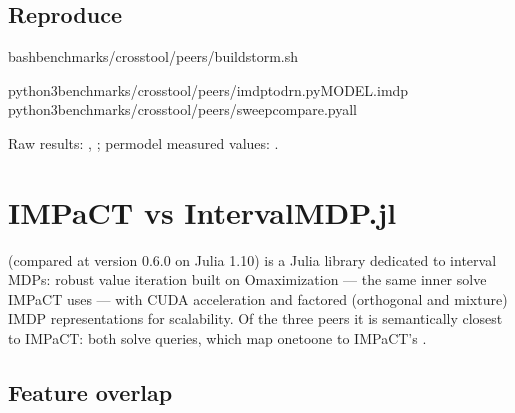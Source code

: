 \documentclass[a4paper,10pt,english]{sphinxmanual}
\begin{document}
\subsection{Reproduce}
\label{\detokenize{comparison/impact-vs-storm:reproduce}}
\begin{sphinxVerbatim}[commandchars=\\\{\}]
bashbenchmarks/crosstool/peers/build\PYGZus{}storm.sh

python3benchmarks/crosstool/peers/imdp\PYGZus{}to\PYGZus{}drn.pyMODEL.imdp
python3benchmarks/crosstool/peers/sweep\PYGZus{}compare.pyall
\end{sphinxVerbatim}

\sphinxAtStartPar
Raw results: , ; per\sphinxhyphen{}model measured
values: .

\sphinxstepscope


\section{IMPaCT vs IntervalMDP.jl}
\label{\detokenize{comparison/impact-vs-intervalmdp:impact-vs-intervalmdp-jl}}\label{\detokenize{comparison/impact-vs-intervalmdp::doc}}
\sphinxAtStartPar
{} (compared at version 0.6.0 on
Julia 1.10) is a Julia library dedicated to interval MDPs: robust value iteration built
on O\sphinxhyphen{}maximization — the same inner solve IMPaCT uses — with CUDA acceleration and
factored (orthogonal and mixture) IMDP representations for scalability. Of the three
peers it is semantically closest to IMPaCT: both solve  queries, which map one\sphinxhyphen{}to\sphinxhyphen{}one to IMPaCT’s .


\subsection{Feature overlap}
\label{\detokenize{comparison/impact-vs-intervalmdp:feature-overlap}}
\end{document}
